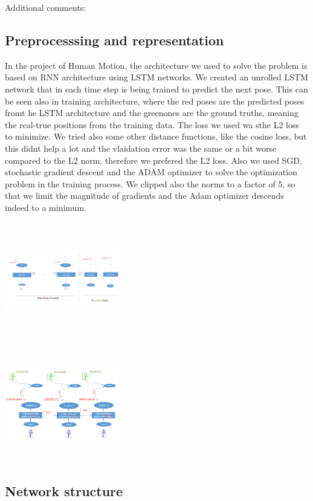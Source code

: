Additional comments: 



\subsection{Preprocesssing and representation}

In the project of Human Motion, the architecture we used to solve the problem 
is based on RNN architecture using LSTM networks. We created an unrolled LSTM network that in each time step is being trained 
to predict the next pose. This can be seen also in training architecture, where the red poses are the predicted poses fromt he LSTM architecture
and the greenones are the ground truths, meaning the real-true positions from the training data.
The loss we used wa sthe L2 loss to minimize. We tried also some other distance functions, like the cosine loss, but this didnt help a lot and the 
vlaidation error was the same or a bit worse compared to the L2 norm, therefore we prefered the L2 loss.
Also we used SGD, stochastic gradient descent and the ADAM optimizer to solve the optimization problem in the training process. We clipped also the 
norms to a factor of 5, so that we limit the magnitude of gradients and the Adam optimizer descends indeed to a minimum.

\includegraphics[width=5cm,height=5cm]{Prediciton_achitecture.PNG}

\includegraphics[width=5cm,height=5cm]{Training_architecture.PNG}
\subsection{Network structure}
 
